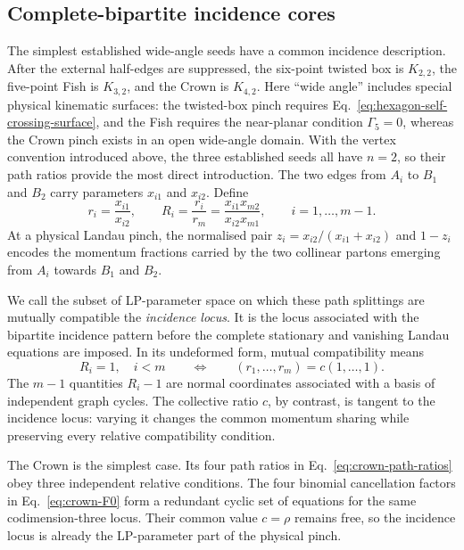 \documentclass[a4paper,11pt]{article}
\begin{document}
\subsection{Complete-bipartite incidence cores}

The simplest established wide-angle seeds have a common incidence
description.  After the external half-edges are suppressed, the six-point
twisted box is \(K_{2,2}\), the five-point Fish is \(K_{3,2}\), and the Crown
is \(K_{4,2}\).  Here ``wide angle'' includes special physical kinematic
surfaces: the twisted-box pinch requires
Eq.~\eqref{eq:hexagon-self-crossing-surface}, and the Fish requires the
near-planar condition \(\Gamma_5=0\), whereas the Crown pinch exists in an
open wide-angle domain.  With the vertex convention introduced above, the
three established seeds all have \(n=2\), so their path ratios provide the
most direct introduction.  The two edges from \(A_i\) to \(B_1\) and \(B_2\)
carry parameters \(x_{i1}\) and \(x_{i2}\).  Define
\begin{equation}
 r_i=\frac{x_{i1}}{x_{i2}},\qquad
 R_i=\frac{r_i}{r_m}
     =\frac{x_{i1}x_{m2}}{x_{i2}x_{m1}},
 \qquad i=1,\ldots,m-1.
 \label{eq:Km2-path-cycle-ratios}
\end{equation}
At a physical Landau pinch, the normalised pair
\(z_i=x_{i2}/(x_{i1}+x_{i2})\) and \(1-z_i\) encodes the momentum fractions
carried by the two collinear partons emerging from \(A_i\) towards \(B_1\)
and \(B_2\).

We call the subset of LP-parameter space on which these path splittings are
mutually compatible the \emph{incidence locus}.  It is the locus associated
with the bipartite incidence pattern before the complete stationary and
vanishing Landau equations are imposed.  In its undeformed form, mutual
compatibility means
\begin{equation}
 R_i=1,\quad i<m
 \qquad\Longleftrightarrow\qquad
 (r_1,\ldots,r_m)=c(1,\ldots,1).
 \label{eq:Km2-undeformed-incidence-locus}
\end{equation}
The \(m-1\) quantities \(R_i-1\) are normal coordinates associated with a
basis of independent graph cycles.  The collective ratio \(c\), by contrast,
is tangent to the incidence locus: varying it changes the common momentum
sharing while preserving every relative compatibility condition.

The Crown is the simplest case.  Its four path ratios in
Eq.~\eqref{eq:crown-path-ratios} obey three independent relative conditions.
The four binomial cancellation factors in Eq.~\eqref{eq:crown-F0} form a
redundant cyclic set of equations for the same codimension-three locus.  Their
common value \(c=\rho\) remains free, so the incidence locus is already the
LP-parameter part of the physical pinch.
\end{document}
